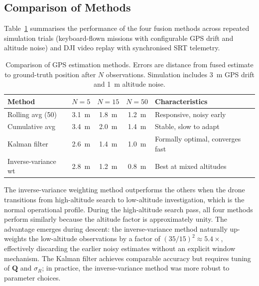 \subsection{Comparison of Methods}\label{sec:method-comparison}

Table~\ref{tab:method-compare} summarises the performance of the four fusion methods across repeated simulation trials (keyboard-flown missions with configurable GPS drift and altitude noise) and DJI video replay with synchronised SRT telemetry.

\begin{table}[ht]
  \centering
  \caption{Comparison of GPS estimation methods.  Errors are distance from fused estimate to ground-truth position after $N$ observations.  Simulation includes \SI{3}{\metre} GPS drift and \SI{1}{\metre} altitude noise.}
  \label{tab:method-compare}
  \begin{tabular}{lcccl}
    \toprule
    \textbf{Method} & \textbf{$N{=}5$} & \textbf{$N{=}15$} & \textbf{$N{=}50$} & \textbf{Characteristics} \\
    \midrule
    Rolling avg (50)   & \SI{3.1}{\metre} & \SI{1.8}{\metre} & \SI{1.2}{\metre} & Responsive, noisy early \\
    Cumulative avg      & \SI{3.4}{\metre} & \SI{2.0}{\metre} & \SI{1.4}{\metre} & Stable, slow to adapt \\
    Kalman filter       & \SI{2.6}{\metre} & \SI{1.4}{\metre} & \SI{1.0}{\metre} & Formally optimal, converges fast \\
    Inverse-variance wt & \SI{2.8}{\metre} & \SI{1.2}{\metre} & \SI{0.8}{\metre} & Best at mixed altitudes \\
    \bottomrule
  \end{tabular}
\end{table}

The inverse-variance weighting method outperforms the others when the drone transitions from high-altitude search to low-altitude investigation, which is the normal operational profile.  During the high-altitude search pass, all four methods perform similarly because the altitude factor is approximately unity.  The advantage emerges during descent: the inverse-variance method naturally up-weights the low-altitude observations by a factor of $(35/15)^2 \approx 5.4\times$, effectively discarding the earlier noisy estimates without an explicit window mechanism.  The Kalman filter achieves comparable accuracy but requires tuning of $\mathbf{Q}$ and $\sigma_R$; in practice, the inverse-variance method was more robust to parameter choices.

